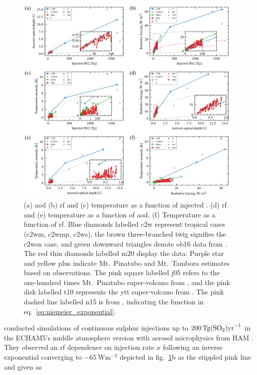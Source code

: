 \documentclass{ametsocV6.1}
\newcommand{\iso}[1][i]{{#1}njected \ce{SO2}}
\begin{document}
\begin{figure}
  \centering
  \includegraphics{figures/figure4.png}

  \caption{(a) \gls{aod} (b) \gls{rf} and (c) temperature as a function of \iso{}\@. (d)
    \gls{rf} and (e) temperature as a function of \gls{aod}. (f) Temperature as a function
    of \gls{rf}. Blue diamonds labelled \gls{c2w} represent tropical cases (\gls{c2wm},
    \gls{c2wmp}, \gls{c2ws}), the brown three-branched twig signifies the \gls{c2wsn} case,
    and green downward triangles denote \gls{ob16} data from \citet{ottobliesner2016}. The
    red thin diamonds labelled \gls{m20} display the \citet{marshall2020dataset} data.
    Purple star and yellow plus indicate Mt.\ Pinatubo and Mt.\ Tambora estimates based on
    observations. The pink square labelled \gls{j05} refers to the one-hundred times Mt.\
    Pinatubo super-volcano from \citet{jones2005}, and the pink disk labelled \gls{t10}
    represents the \gls{ytt} super-volcano from \citet{timmreck2010}. The pink dashed line
    labelled \gls{n15} is from \citet{niemeier2015}, indicating the function in
    eq.~\ref{eq:niemeier_exponential}.}\label{fig:parameter_scan}%
\end{figure}

\citet{niemeier2015} conducted simulations of continuous sulphur injections up to
\(\SI{200}{\tera\gram(\ce{SO2})\mathrm{yr}^{-1}}\) in the ECHAM5's middle atmosphere
version \citep{giorgetta2006} with aerosol microphysics from HAM \citep{stier2005}. They
observed an \gls{rf} dependence on injection rate \(x\) following an inverse exponential
converging to \(\SI{-65}{\watt\meter^{-2}}\) depicted in fig.~\ref{fig:parameter_scan}b
as the stippled pink line and given as
\end{document}
